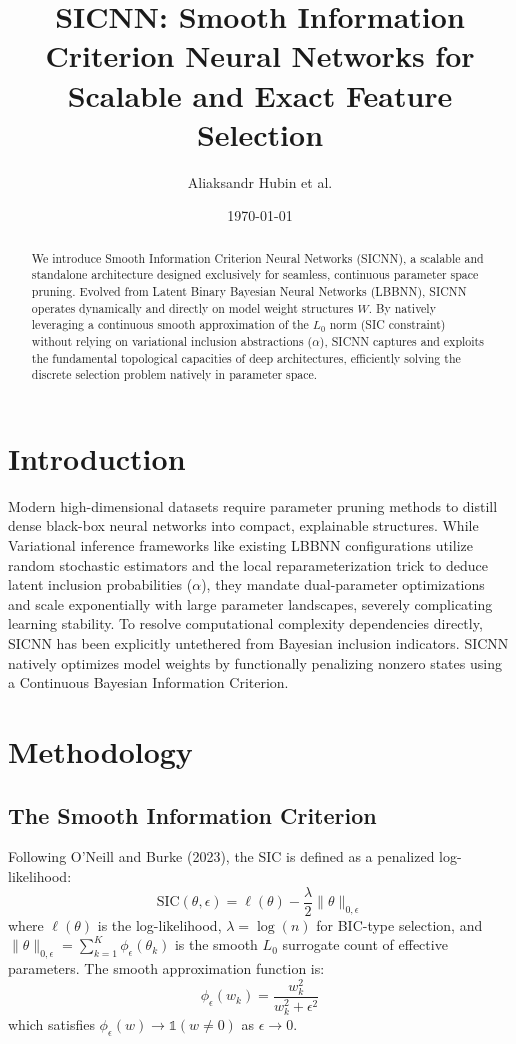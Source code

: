 \documentclass{article}
\title{SICNN: Smooth Information Criterion Neural Networks for Scalable and Exact Feature Selection}
\author{Aliaksandr Hubin et al.}
\date{\today}
\begin{document}
\maketitle

\begin{abstract}
We introduce Smooth Information Criterion Neural Networks (SICNN), a scalable and standalone architecture designed exclusively for seamless, continuous parameter space pruning. Evolved from Latent Binary Bayesian Neural Networks (LBBNN), SICNN operates dynamically and directly on model weight structures $W$. By natively leveraging a continuous smooth approximation of the $L_0$ norm (SIC constraint) without relying on variational inclusion abstractions ($\alpha$), SICNN captures and exploits the fundamental topological capacities of deep architectures, efficiently solving the discrete selection problem natively in parameter space.
\end{abstract}

\section{Introduction}
Modern high-dimensional datasets require parameter pruning methods to distill dense black-box neural networks into compact, explainable structures. While Variational inference frameworks like existing LBBNN configurations utilize random stochastic estimators and the local reparameterization trick to deduce latent inclusion probabilities ($\alpha$), they mandate dual-parameter optimizations and scale exponentially with large parameter landscapes, severely complicating learning stability. To resolve computational complexity dependencies directly, SICNN has been explicitly untethered from Bayesian inclusion indicators. SICNN natively optimizes model weights by functionally penalizing nonzero states using a Continuous Bayesian Information Criterion.

\section{Methodology}
\subsection{The Smooth Information Criterion}
Following O'Neill and Burke (2023), the SIC is defined as a penalized log-likelihood:
\begin{equation}
\text{SIC}(\theta, \epsilon) = \ell(\theta) - \frac{\lambda}{2} \|\theta\|_{0,\epsilon}
\end{equation}
where $\ell(\theta)$ is the log-likelihood, $\lambda = \log(n)$ for BIC-type selection, and $\|\theta\|_{0,\epsilon} = \sum_{k=1}^K \phi_\epsilon(\theta_k)$ is the smooth $L_0$ surrogate count of effective parameters. The smooth approximation function is:
\begin{equation}
\phi_\epsilon(w_k) = \frac{w_k^2}{w_k^2 + \epsilon^2}
\end{equation}
which satisfies $\phi_\epsilon(w) \to \mathbb{1}(w \neq 0)$ as $\epsilon \to 0$.
\end{document}
